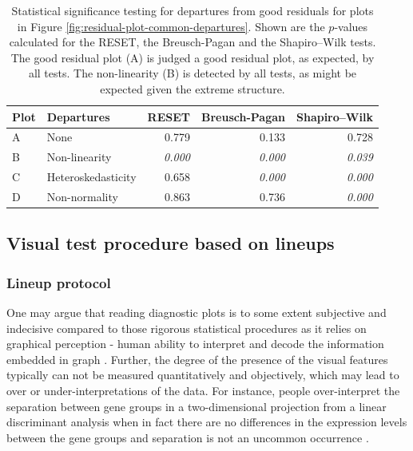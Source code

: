 \documentclass[]{interact}
\theoremstyle{plain}%
\theoremstyle{definition}
\theoremstyle{remark}
\begin{document}
\begin{table}

\caption{\label{tab:example-residual-plot-table}Statistical significance testing for departures from good residuals for plots in Figure \ref{fig:residual-plot-common-departures}. Shown are the $p$-values calculated for the RESET, the Breusch-Pagan and the Shapiro–Wilk tests. The good residual plot (A) is judged a good residual plot, as expected, by all tests. The non-linearity (B) is detected by all tests, as might be expected given the extreme structure.}
\centering
\begin{tabular}[t]{llrrr}
\toprule
Plot & Departures & RESET & Breusch-Pagan & Shapiro–Wilk\\
\midrule
A & None & 0.779 & 0.133 & 0.728\\
B & Non-linearity & \em{0.000} & \em{0.000} & \em{0.039}\\
C & Heteroskedasticity & 0.658 & \em{0.000} & \em{0.000}\\
D & Non-normality & 0.863 & 0.736 & \em{0.000}\\
\bottomrule
\end{tabular}
\end{table}

\hypertarget{visual-test-procedure-based-on-lineups}{%
\subsection{Visual test procedure based on
lineups}\label{visual-test-procedure-based-on-lineups}}

\hypertarget{lineup-protocol}{%
\subsubsection{Lineup protocol}\label{lineup-protocol}}

One may argue that reading diagnostic plots is to some extent subjective
and indecisive compared to those rigorous statistical procedures as it
relies on graphical perception - human ability to interpret and decode
the information embedded in graph \citep{cleveland_graphical_1984}.
Further, the degree of the presence of the visual features typically can
not be measured quantitatively and objectively, which may lead to over
or under-interpretations of the data. For instance, people
over-interpret the separation between gene groups in a two-dimensional
projection from a linear discriminant analysis when in fact there are no
differences in the expression levels between the gene groups and
separation is not an uncommon occurrence
\citep{roy_chowdhury_using_2015}.
\end{document}
